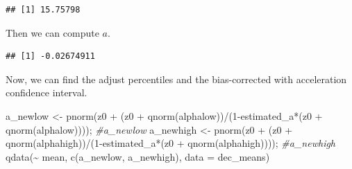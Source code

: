 \documentclass[12pt]{article}
\newenvironment{Shaded}{\begin{snugshade}}{\end{snugshade}}
\newcommand{\AttributeTok}[1]{\textcolor[rgb]{0.77,0.63,0.00}{#1}}
\newcommand{\CommentTok}[1]{\textcolor[rgb]{0.56,0.35,0.01}{\textit{#1}}}
\newcommand{\DecValTok}[1]{\textcolor[rgb]{0.00,0.00,0.81}{#1}}
\newcommand{\FloatTok}[1]{\textcolor[rgb]{0.00,0.00,0.81}{#1}}
\newcommand{\FunctionTok}[1]{\textcolor[rgb]{0.00,0.00,0.00}{#1}}
\newcommand{\NormalTok}[1]{#1}
\newcommand{\OtherTok}[1]{\textcolor[rgb]{0.56,0.35,0.01}{#1}}
\newcommand{\SpecialCharTok}[1]{\textcolor[rgb]{0.00,0.00,0.00}{#1}}
\begin{document}
\begin{verbatim}
## [1] 15.75798
\end{verbatim}

Then we can compute \(a\).

\begin{Shaded}
\end{Shaded}

\begin{verbatim}
## [1] -0.02674911
\end{verbatim}

Now, we can find the adjust percentiles and the bias-corrected with
acceleration confidence interval.

\begin{Shaded}
\begin{Highlighting}[]
\NormalTok{a\_newlow }\OtherTok{\textless{}{-}} \FunctionTok{pnorm}\NormalTok{(z0 }\SpecialCharTok{+}\NormalTok{ (z0 }\SpecialCharTok{+} \FunctionTok{qnorm}\NormalTok{(alphalow))}\SpecialCharTok{/}\NormalTok{(}\DecValTok{1}\SpecialCharTok{{-}}\NormalTok{estimated\_a}\SpecialCharTok{*}\NormalTok{(z0 }\SpecialCharTok{+} \FunctionTok{qnorm}\NormalTok{(alphalow)))); }\CommentTok{\#a\_newlow}
\NormalTok{a\_newhigh }\OtherTok{\textless{}{-}} \FunctionTok{pnorm}\NormalTok{(z0 }\SpecialCharTok{+}\NormalTok{ (z0 }\SpecialCharTok{+} \FunctionTok{qnorm}\NormalTok{(alphahigh))}\SpecialCharTok{/}\NormalTok{(}\DecValTok{1}\SpecialCharTok{{-}}\NormalTok{estimated\_a}\SpecialCharTok{*}\NormalTok{(z0 }\SpecialCharTok{+} \FunctionTok{qnorm}\NormalTok{(alphahigh)))); }\CommentTok{\#a\_newhigh}
\FunctionTok{qdata}\NormalTok{(}\SpecialCharTok{\textasciitilde{}}\NormalTok{ mean, }\FunctionTok{c}\NormalTok{(a\_newlow, a\_newhigh), }\AttributeTok{data =}\NormalTok{ dec\_means)}
\end{Highlighting}
\end{Shaded}
\end{document}
